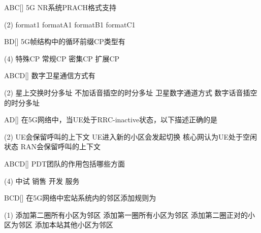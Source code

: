 \begin{choice}{\;ABC\;}[]
    5G NR系统PRACH格式支持
    \begin{tasks}(2)
        \task format1
        \task formatA1
        \task formatB1
        \task formatC1
    \end{tasks}
\end{choice}


\begin{choice}{\;BD\;}[]
    5G帧结构中的循环前缀CP类型有
    \begin{tasks}(4)
        \task 特殊CP
        \task 常规CP
        \task 密集CP
        \task 扩展CP
    \end{tasks}
\end{choice}


\begin{choice}{\;ABCD\;}[]
    数字卫星通信方式有

    \begin{tasks}(2)
        \task 星上交换时分多址
        \task 不加话音插空的时分多址
        \task 卫星数字通道方式
        \task 数字话音插空的时分多址
    \end{tasks}
\end{choice}

\begin{choice}{\;AD\;}[]
    在5G网络中，当UE处于RRC-inactive状态，以下描述正确的是
    \begin{tasks}(2)
        \task UE会保留呼叫的上下文
        \task UE进入新的小区会发起切换
        \task 核心网认为UE处于空闲状态
        \task RAN会保留呼叫的上下文
    \end{tasks}
\end{choice}

\begin{choice}{\;ABCD\;}[]
    PDT团队的作用包括哪些方面
    \begin{tasks}(4)
        \task 中试
        \task 销售
        \task 开发
        \task 服务
    \end{tasks}
\end{choice}

\begin{choice}{\;BCD\;}[]
    在5G网络中宏站系统内的邻区添加规则为
    \begin{tasks}(1)
        \task 添加第二圈所有小区为邻区
        \task 添加第一圈所有小区为邻区
        \task 添加第二圈正对的小区为邻区
        \task 添加本站其他小区为邻区
    \end{tasks}
\end{choice}

